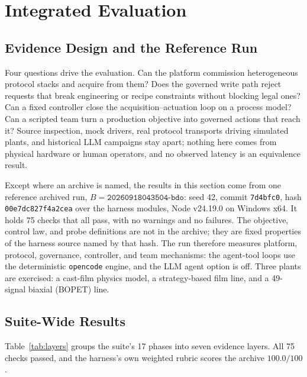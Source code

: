 \section{Integrated Evaluation}
\label{sec:eval}

\subsection{Evidence Design and the Reference Run}
\label{sec:protocol}
\label{sec:static}
Four questions drive the evaluation. Can the platform commission heterogeneous
protocol stacks and acquire from them? Does the governed write path reject requests
that break engineering or recipe constraints without blocking legal ones? Can a
fixed controller close the acquisition--actuation loop on a process model? Can a
scripted team turn a production objective into governed actions that reach it?
Source
inspection, mock drivers, real protocol transports driving simulated plants, and
historical LLM campaigns stay apart; nothing here comes from physical hardware or
human operators, and no observed latency is an equivalence result.

Except where an archive is named, the results in this section come from one reference archived run,
$B=\texttt{20260918043504-bdo}$: seed 42, commit \texttt{7d4bfc0}, hash \texttt{00e7dc827f4a2cea} over the harness modules, Node v24.19.0 on Windows x64. It holds 75 checks that all
pass, with no warnings and no failures. The objective, control law, and probe
definitions are not in the archive; they are fixed properties of the harness source
named by that hash. The run therefore measures platform, protocol, governance,
controller, and team mechanisms: the agent-tool loops use the deterministic
\texttt{opencode} engine, and the LLM agent option is off. Three plants are exercised: a
cast-film physics model, a strategy-based film line, and a 49-signal biaxial (BOPET)
line.

\subsection{Suite-Wide Results}
\label{sec:suite}
Table~\ref{tab:layers} groups the suite's 17 phases into seven evidence layers.
All 75 checks passed, and the harness's own weighted rubric scores the archive
$100.0/100$.

